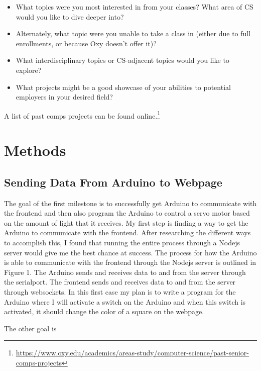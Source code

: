 \documentclass[10pt,twocolumn]{article}
\begin{document}
\begin{itemize}
    \item What topics were you most interested in from your classes? What area of CS would you like to dive deeper into?
    \item Alternately, what topic were you unable to take a class in (either due to full enrollments, or because Oxy doesn't offer it)?
    \item What interdisciplinary topics or CS-adjacent topics would you like to explore?
    \item What projects might be a good showcase of your abilities to potential employers in your desired field?
\end{itemize}

A list of past comps projects can be found online.\footnote{\url{https://www.oxy.edu/academics/areas-study/computer-science/past-senior-comps-projects}}

\section{Methods}

\subsection{Sending Data From Arduino to Webpage}

The goal of the first milestone is to successfully get Arduino to communicate with the frontend and then also program the Arduino to control a servo motor based on the amount of light that it receives. My first step is finding a way to get the Arduino to communicate with the frontend. After researching the different ways to accomplish this, I found that running the entire process through a Nodejs server would give me the best chance at success. The process for how the Arduino is able to communicate with the frontend through the Nodejs server is outlined in Figure 1. The Arduino sends and receives data to and from the server through the serialport. The frontend sends and receives data to and from the server through websockets. In this first case my plan is to write a program for the Arduino where I will activate a switch on the Arduino and when this switch is activated, it should change the color of a square on the webpage.

The other goal is
\end{document}
